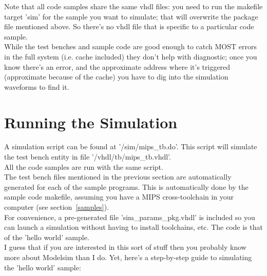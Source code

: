     
    Note that all code samples share the same vhdl files: you need to run the 
    makefile target 'sim' for the sample you want to simulate; that will 
    overwrite the package file mentioned above. So there's no vhdl file that is
    specific to a particular code sample.\\
        
    While the test benches and sample code are good enough to catch MOST errors
    in the full system (i.e. cache included) they don't help with diagnostic;
    once you know there's an error, and the approximate address where it's
    triggered (approximate because of the cache) you have to dig into the 
    simulation waveforms to find it.\\
    
\section{Running the Simulation}
\label{running_the_simulation}

    A simulation script can be found at '/sim/mips\_tb.do'. This script will
    simulate the test bench entity in file '/vhdl/tb/mips\_tb.vhdl'.\\
    
    All the code samples are run with the same script.\\

    The test bench files mentioned in the previous section are automatically 
    generated for each of the sample programs. This is automatically done by the 
    sample code makefile,
    assuming you have a MIPS cross-toolchain in your computer (see section~\ref{samples}).\\

    For convenience, a pre-generated file 'sim\_params\_pkg.vhdl' is included 
    so you can launch a simulation without having to install toolchains, etc. 
    The code is that of the 'hello world' sample.\\

    I guess that if you are interested in this sort of stuff then you probably
    know more about Modelsim than I do. Yet, here's a step-by-step guide to
    simulating the 'hello world' sample:
    
